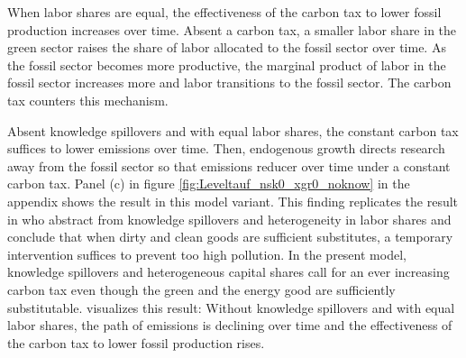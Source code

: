 When labor shares are equal, the effectiveness of the carbon tax to lower fossil production increases over time. 
Absent a carbon tax, a smaller labor share in the green sector raises the share of labor allocated to the fossil sector over time. As the fossil sector becomes more productive, the marginal product of labor in the fossil sector increases more and labor transitions to the fossil sector. The carbon tax counters this mechanism. %

 
 
 Absent knowledge spillovers and with equal labor shares, the constant carbon tax suffices to lower emissions over time. Then, endogenous growth directs research away from the fossil sector so that emissions reducer over time under a constant carbon tax. Panel (c) in figure \ref{fig:Leveltauf_nsk0_xgr0_noknow} in the appendix shows the result in this model variant. 
 This finding replicates the result in \cite{Acemoglu2012TheChange} who abstract from knowledge spillovers and heterogeneity in labor shares and conclude that when dirty and clean goods are sufficient substitutes, a temporary intervention suffices to prevent too high pollution. In the present model, knowledge spillovers and heterogeneous capital shares 
 call for an ever increasing carbon tax even though the green and the energy good are sufficiently substitutable.  visualizes this result: Without knowledge spillovers and with equal labor shares, the path of emissions is declining over time and the effectiveness of the carbon tax to lower fossil production rises. 
 

